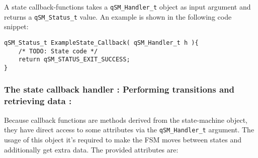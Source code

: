 A state callback-functions takes a \lstinline{qSM_Handler_t} object as input argument and returns a \lstinline{qSM_Status_t} value. An example is shown in the following code snippet:
\medskip

\begin{lstlisting}[style=CStyle]
qSM_Status_t ExampleState_Callback( qSM_Handler_t h ){
    /* TODO: State code */
    return qSM_STATUS_EXIT_SUCCESS;
}
\end{lstlisting} 


\subsubsection{The state callback handler : Performing transitions and retrieving data : }

Because callback functions are methods derived from the state-machine object, they have direct access to some attributes via the \lstinline{qSM_Handler_t} argument. 
The usage of this object it's required to make the FSM moves between states and additionally get extra data. The provided attributes are:

